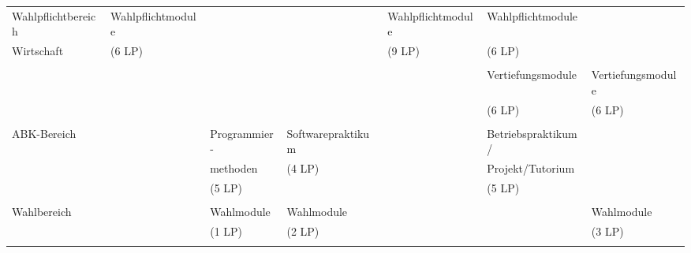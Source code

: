 \begin{center}
\begin{tabular}{||l||l|l|l|l|l|l||}
\hhline{|:=::======:|} Wahlpflichtbereich&Wahlpflichtmodule&&&Wahlpflichtmodule&Wahlpflichtmodule&\\
\hhline{||~||~|~|~|~|~|~||} Wirtschaft&(6 LP)&&&(9 LP)&(6 LP)&\\
\hhline{||~||~|~|~|~|~|~||} &&&&&&\\
\hhline{||~||~|~|~|~|~|~||} &&&&&Vertiefungsmodule&Vertiefungsmodule\\
\hhline{||~||~|~|~|~|~|~||} &&&&&(6 LP)&(6 LP)\\
\hhline{||~||~|~|~|~|~|~||} &&&&&&\\
\hhline{|:=::======:|} ABK-Bereich&&Programmier-&Softwarepraktikum&&Betriebspraktikum/&\\
\hhline{||~||~|~|~|~|~|~||} &&methoden&(4 LP)&&Projekt/Tutorium&\\
\hhline{||~||~|~|~|~|~|~||} &&(5 LP)&&&(5 LP)&\\
\hhline{||~||~|~|~|~|~|~||} &&&&&&\\
\hhline{|:=::======:|} Wahlbereich&&Wahlmodule&Wahlmodule&&&Wahlmodule\\
\hhline{||~||~|~|~|~|~|~||} &&(1 LP)&(2 LP)&&&(3 LP)\\
\hhline{|b:=:b:======:b|}
\end{tabular}
\end{center}
\clearpage
